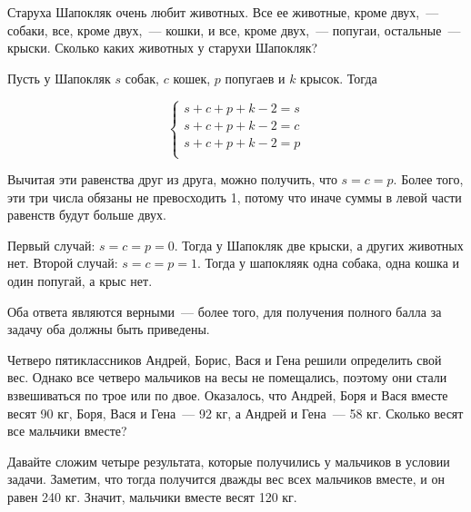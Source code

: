 

\begin{itemize}
\itA Старуха Шапокляк очень любит животных. Все ее животные, кроме двух,~— собаки, все, кроме двух,~— кошки, и все, кроме двух,~— попугаи, остальные~— крыски. Сколько каких животных у старухи Шапокляк?

\itr Пусть у Шапокляк $s$ собак, $c$ кошек, $p$ попугаев и $k$ крысок. Тогда

$$
\begin{cases}
s+c+p+k -2 = s \\
s+c+p+k -2 = c \\
s+c+p+k -2 = p \\
\end{cases}
$$

Вычитая эти равенства друг из друга, можно получить, что $s=c=p$. Более того, эти три числа обязаны не превосходить 1, потому что иначе суммы в левой части равенств будут больше двух.

Первый случай: $s=c=p=0$. Тогда у Шапокляк две крыски, а других животных нет. Второй случай: $s=c=p=1$. Тогда у шапокляяк одна собака, одна кошка и один попугай, а крыс нет.

Оба ответа являются верными~— более того, для получения полного балла за задачу оба должны быть приведены.

\itB Четверо пятиклассников Андрей, Борис, Вася и Гена решили определить свой вес. Однако  все четверо мальчиков на весы не помещались, поэтому они стали взвешиваться по трое или по двое. Оказалось, что Андрей, Боря и Вася вместе весят 90 кг, Боря, Вася и Гена~— 92 кг, а Андрей и Гена~— 58 кг. Сколько весят все мальчики вместе?

\itr Давайте сложим четыре результата, которые получились у мальчиков в условии задачи. Заметим, что тогда получится дважды вес всех мальчиков вместе, и он равен 240 кг. Значит, мальчики вместе весят 120 кг.

\end{itemize}



